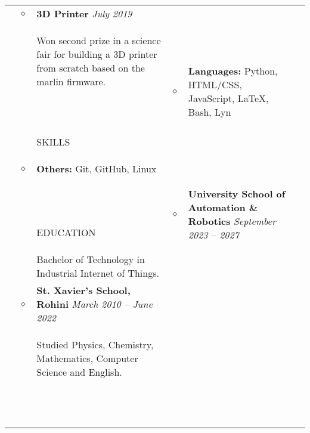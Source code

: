 \documentclass[11pt]{article}
\begin{document}
\begin{tabularx}{\textwidth}{@{}b{90px} b{9px}@{} X@{}}
        \\ & $\diamond$ &

        \textbf{3D Printer} \hfill \textit{July 2019} \\ & &
        Won second prize in a science fair for building a 3D printer from scratch based on the marlin firmware.

        \iftoggle{lines}{\\ \\ \hline \\}{\\ \\}


        \lettrine[lines=1,loversize=-0.5]{S}KILLS & $\diamond$ &

        \textbf{Languages:} Python, HTML/CSS, JavaScript, \LaTeX, Bash, Lyn & &

        \\ & $\diamond$ &

        \textbf{Others:} Git, GitHub, Linux \\ & &

        \iftoggle{lines}{\\ \\ \hline \\}{\\ \\}


        \lettrine[lines=1,loversize=-0.5]{E}DUCATION & $\diamond$ &

        \textbf{University School of Automation \& Robotics} \hfill \textit{September 2023 -- 2027} \\ & &
        Bachelor of Technology in Industrial Internet of Things.

        \\ & $\diamond$ &

        \textbf{St. Xavier's School, Rohini} \hfill \textit{March 2010 -- June 2022} \\ & &
        Studied Physics, Chemistry, Mathematics, Computer Science and English.

        \iftoggle{lines}{\\ \\ \hline \\}{\\ \\}



\end{tabularx}
\end{document}
